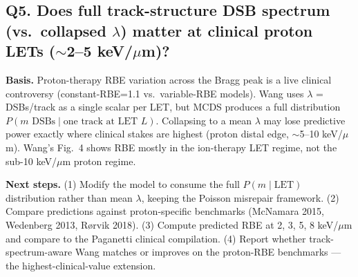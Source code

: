 \subsection*{Q5. Does full track-structure DSB spectrum (vs.\ collapsed $\lambda$) matter at clinical proton LETs ($\sim$2--5 keV/$\mu$m)?}

\textbf{Basis.} Proton-therapy RBE variation across the Bragg peak is a live clinical controversy (constant-RBE=1.1 vs.\ variable-RBE models). Wang uses $\lambda$ = DSBs/track as a single scalar per LET, but MCDS produces a full distribution $P(m \text{ DSBs} \mid \text{one track at LET }L)$. Collapsing to a mean $\lambda$ may lose predictive power exactly where clinical stakes are highest (proton distal edge, $\sim$5--10 keV/$\mu$m). Wang's Fig.\ 4 shows RBE mostly in the ion-therapy LET regime, not the sub-10 keV/$\mu$m proton regime.

\textbf{Next steps.} (1) Modify the model to consume the full $P(m \mid \text{LET})$ distribution rather than mean $\lambda$, keeping the Poisson misrepair framework. (2) Compare predictions against proton-specific benchmarks (McNamara 2015, Wedenberg 2013, R{\o}rvik 2018). (3) Compute predicted RBE at 2, 3, 5, 8 keV/$\mu$m and compare to the Paganetti clinical compilation. (4) Report whether track-spectrum-aware Wang matches or improves on the proton-RBE benchmarks --- the highest-clinical-value extension.
